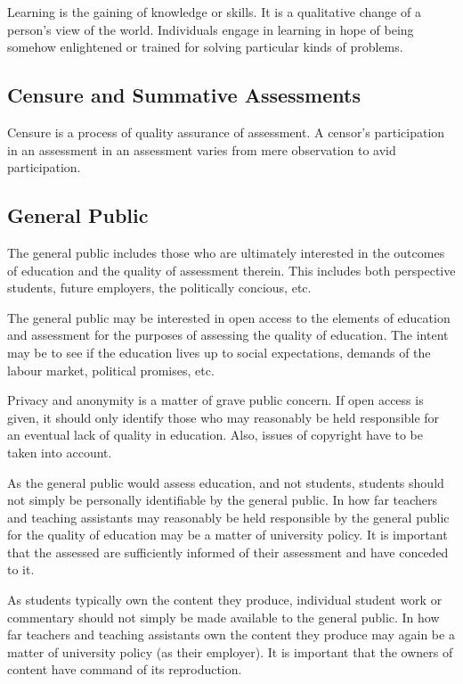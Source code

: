 Learning is the gaining of knowledge or skills. It is a qualitative change of a
person's view of the world. Individuals engage in learning in hope of being
somehow enlightened or trained for solving particular kinds of problems.

\subsection{Censure and Summative Assessments}

Censure is a process of quality assurance of assessment. A censor's
participation in an assessment in an assessment varies from mere observation to
avid participation.

\subsection{General Public}

The general public includes those who are ultimately interested in the outcomes
of education and the quality of assessment therein. This includes both
perspective students, future employers, the politically concious, etc.

The general public may be interested in open access to the elements of
education and assessment for the purposes of assessing the quality of
education. The intent may be to see if the education lives up to social
expectations, demands of the labour market, political promises, etc.

Privacy and anonymity is a matter of grave public concern. If open access is
given, it should only identify those who may reasonably be held responsible for
an eventual lack of quality in education. Also, issues of copyright have to be
taken into account.

As the general public would assess education, and not students, students should
not simply be personally identifiable by the general public. In how far
teachers and teaching assistants may reasonably be held responsible by the
general public for the quality of education may be a matter of university
policy. It is important that the assessed are sufficiently informed of their
assessment and have conceded to it.

As students typically own the content they produce, individual student work or
commentary should not simply be made available to the general public. In how
far teachers and teaching assistants own the content they produce may again be
a matter of university policy (as their employer). It is important that the
owners of content have command of its reproduction.
